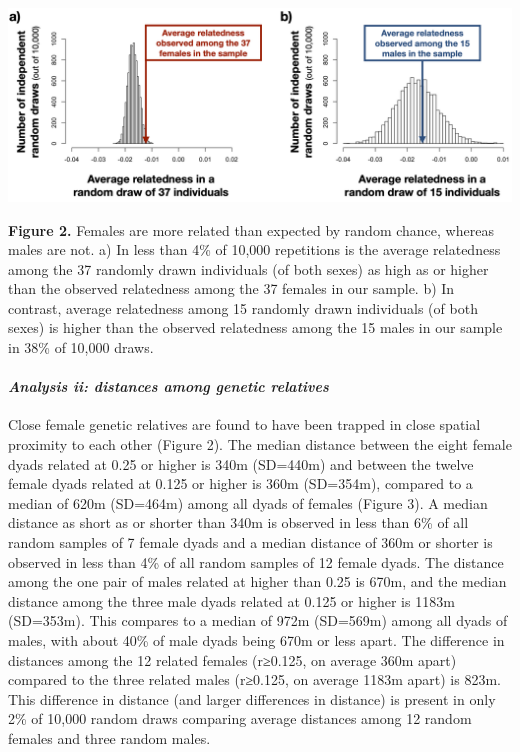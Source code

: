 \documentclass[]{article}
\let\oldparagraph\paragraph
\renewcommand{\paragraph}[1]{\oldparagraph{#1}\mbox{}}
\begin{document}
\includegraphics{gdispersal_Figure1.png}

\textbf{Figure 2.} Females are more related than expected by random
chance, whereas males are not. a) In less than 4\% of 10,000 repetitions
is the average relatedness among the 37 randomly drawn individuals (of
both sexes) as high as or higher than the observed relatedness among the
37 females in our sample. b) In contrast, average relatedness among 15
randomly drawn individuals (of both sexes) is higher than the observed
relatedness among the 15 males in our sample in 38\% of 10,000 draws.

\newpage

\hypertarget{analysis-ii-distances-among-genetic-relatives-1}{%
\paragraph{\texorpdfstring{\emph{Analysis ii: distances among genetic
relatives}}{Analysis ii: distances among genetic relatives}}\label{analysis-ii-distances-among-genetic-relatives-1}}

Close female genetic relatives are found to have been trapped in close
spatial proximity to each other (Figure 2). The median distance between
the eight female dyads related at 0.25 or higher is 340m (SD=440m) and
between the twelve female dyads related at 0.125 or higher is 360m
(SD=354m), compared to a median of 620m (SD=464m) among all dyads of
females (Figure 3). A median distance as short as or shorter than 340m
is observed in less than 6\% of all random samples of 7 female dyads and
a median distance of 360m or shorter is observed in less than 4\% of all
random samples of 12 female dyads. The distance among the one pair of
males related at higher than 0.25 is 670m, and the median distance among
the three male dyads related at 0.125 or higher is 1183m (SD=353m). This
compares to a median of 972m (SD=569m) among all dyads of males, with
about 40\% of male dyads being 670m or less apart. The difference in
distances among the 12 related females (r≥0.125, on average 360m apart)
compared to the three related males (r≥0.125, on average 1183m apart) is
823m. This difference in distance (and larger differences in distance)
is present in only 2\% of 10,000 random draws comparing average
distances among 12 random females and three random males.
\end{document}
